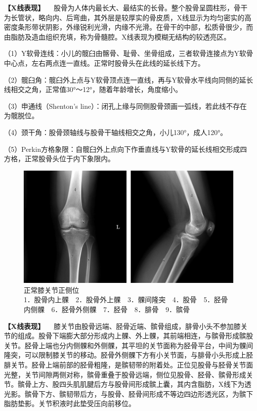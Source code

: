 \textbf{【X线表现】}
　股骨为人体内最长大、最结实的长骨。整个股骨呈圆柱形，骨干为长管状，略向内、后弯曲，其外层是较厚实的骨皮质，X线显示为均匀密实的高密度条形带状阴影，外缘锐利光滑，内缘不光滑。在骨干的中部，松质骨很少，而由脂肪及造血组织充填，称为骨髓腔。X线表现为模糊无结构的较透亮区。

（1）Y软骨连线：小儿的髋臼由髂骨、耻骨、坐骨组成，三者软骨连接点为Y软骨中心点，左右两点连一直线。正常时股骨头在此线的延长线下方。

（2）髋臼角：髋臼外上点与Y软骨顶点连一直线，再与Y软骨水平线向同侧的延长线相交之角，正常值30°～12°，随着年龄增长，角度缩小。

（3）申通线（Shenton's
line）：闭孔上缘与同侧股骨颈画一弧线，若此线不存在为髋脱位。

（4）颈干角：股骨颈轴线与股骨干轴线相交之角，小儿130°，成人120°。

（5）Perkin方格象限：自髋臼外上点向下作垂直线与Y软骨的延长线相交形成四方格，正常股骨头位于内下象限内。

\begin{figure}[!htbp]
 \centering
 \includegraphics{./images/Image00008.jpg}
 \captionsetup{justification=centering}
 \caption{正常膝关节正侧位\\{\small 1．股骨内上髁　2．股骨外上髁　3．髁间隆突　4．股骨　5．胫骨内侧髁　6．胫骨外侧髁　7．胫骨　8．腓骨　9．髌骨}}
 \label{fig2-1-6}
  \end{figure} 

\textbf{【X线表现】}
　膝关节由股骨远端、胫骨近端、髌骨组成，腓骨小头不参加膝关节的组成。股骨下端膨大部分形成内上髁、外上髁，其前端相连，与髌骨形成髌股关节。胫骨上端也分内侧髁和外侧髁，其平坦的关节面称为胫骨平台，中间为髁间隆突，可以限制膝关节的移动。胫骨外侧髁下方有小关节面，与腓骨小头形成上胫腓关节。胫骨上端前部的胫骨粗隆，是髌韧带的附着处。正位见股骨与胫骨关节面光整，关节间隙两侧对称，髌骨重叠于股骨远端，侧位见股骨、胫骨、髌骨形成关节。髌骨上方、股四头肌肌腱后方与股骨间形成髌上囊，其内含脂肪，X线下为透光影。髌骨下方、髌韧带后方，与股骨、胫骨间形成不等边四边形透光区，为髌下脂肪垫影。关节积液时此垫受压向前移位。

